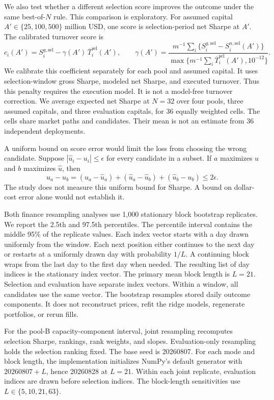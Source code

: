 \documentclass[10pt,letterpaper]{article}
\begin{document}
We also test whether a different selection score improves the outcome under the same best-of-$N$ rule. This comparison is exploratory. For assumed capital $A'\in\{25,100,500\}$ million USD, one score is selection-period net Sharpe at $A'$. The calibrated turnover score is
\[
 c_i(A')=S_i^{g,\mathrm{sel}}-\gamma(A')\,\overline T_i^{\mathrm{sel}}(A'),
 \qquad
 \gamma(A')=
 \frac{m^{-1}\sum_i\{S_i^{g,\mathrm{sel}}-S_i^{n,\mathrm{sel}}(A')\}}
 {\max\{m^{-1}\sum_i\overline T_i^{\mathrm{sel}}(A'),10^{-12}\}}.
\]
We calibrate this coefficient separately for each pool and assumed capital. It uses selection-window gross Sharpe, modeled net Sharpe, and executed turnover. Thus this penalty requires the execution model. It is not a model-free turnover correction. We average expected net Sharpe at $N=32$ over four pools, three assumed capitals, and three evaluation capitals, for 36 equally weighted cells. The cells share market paths and candidates. Their mean is not an estimate from 36 independent deployments.

A uniform bound on score error would limit the loss from choosing the wrong candidate. Suppose $|\widehat u_i-u_i|\leq\epsilon$ for every candidate in a subset. If $a$ maximizes $u$ and $b$ maximizes $\widehat u$, then
\[
 u_a-u_b=(u_a-\widehat u_a)+(\widehat u_a-\widehat u_b)
                  +(\widehat u_b-u_b)\leq2\epsilon.
\]
The study does not measure this uniform bound for Sharpe. A bound on dollar-cost error alone would not establish it.

Both finance resampling analyses use 1,000 stationary block bootstrap replicates. We report the 2.5th and 97.5th percentiles. The percentile interval contains the middle 95\% of the replicate values. Each index vector starts with a day drawn uniformly from the window. Each next position either continues to the next day or restarts at a uniformly drawn day with probability $1/L$. A continuing block wraps from the last day to the first day when needed. The resulting list of day indices is the stationary index vector. The primary mean block length is $L=21$. Selection and evaluation have separate index vectors. Within a window, all candidates use the same vector. The bootstrap resamples stored daily outcome components. It does not reconstruct prices, refit the ridge models, regenerate portfolios, or rerun fills.

For the pool-B capacity-component interval, joint resampling recomputes selection Sharpe, rankings, rank weights, and slopes. Evaluation-only resampling holds the selection ranking fixed. The base seed is 20260807. For each mode and block length, the implementation initializes NumPy's default generator with $20260807+L$, hence 20260828 at $L=21$. Within each joint replicate, evaluation indices are drawn before selection indices. The block-length sensitivities use $L\in\{5,10,21,63\}$.
\end{document}
